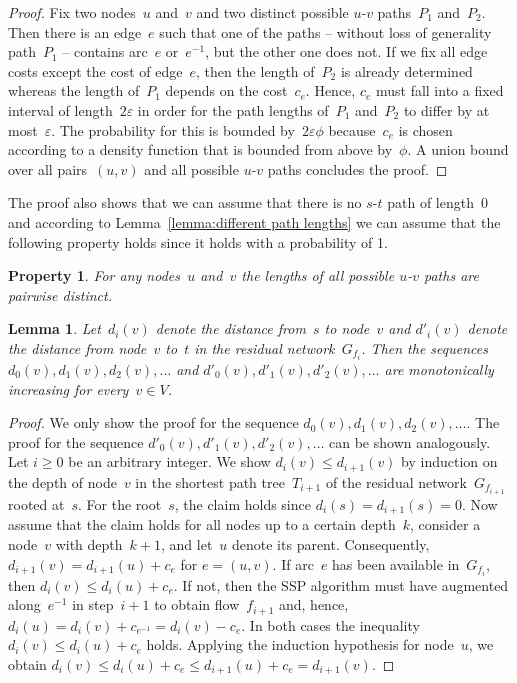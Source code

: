 \documentclass[11pt]{article}
\newtheorem{lemma}[theorem]{Lemma}
\newtheorem{property}[theorem]{Property}
\newcommand{\e}{\varepsilon}
\begin{document}
\begin{proof}
Fix two nodes~$u$ and~$v$ and two distinct possible $u$-$v$ paths~$P_1$ and~$P_2$. Then there is an edge~$e$ such that one of the paths -- without loss of generality path~$P_1$ -- contains arc~$e$ or~$e^{-1}$, but the other one does not. If we fix all edge costs except the cost of edge~$e$, then the length of~$P_2$ is already determined whereas the length of~$P_1$ depends on the cost~$c_e$. Hence, $c_e$ must fall into a fixed interval of length~$2\e$ in order for the path lengths of~$P_1$ and~$P_2$ to differ by at most~$\e$. The probability for this is bounded by~$2\e \phi$ because~$c_e$ is chosen according to a density function that is bounded from above by~$\phi$. A union bound over all pairs~$(u, v)$ and all possible $u$-$v$ paths concludes the proof. \end{proof}

The proof also shows that we can assume that there is no $s$-$t$ path of length~$0$ and according to Lemma~\ref{lemma:different path lengths} we can assume that the following property holds since it holds with a probability of 1.

\begin{property}
\label{property:different path lengths}
For any nodes~$u$ and~$v$ the lengths of all possible $u$-$v$ paths are pairwise distinct.
\end{property}

\begin{lemma}\label{lemma:distance monotonicity}
Let~$d_i(v)$ denote the distance from~$s$ to node~$v$ and $d'_i(v)$ denote the distance from node~$v$ to~$t$ in the residual network~$G_{f_i}$. Then
the sequences $d_0(v), d_1(v), d_2(v), \ldots$ and $d'_0(v), d'_1(v), d'_2(v), \ldots$ are monotonically increasing
for every~$v\in V$.
\end{lemma}

\begin{proof}
We only show the proof for the sequence $d_0(v), d_1(v), d_2(v), \ldots$. The proof for the sequence $d'_0(v), d'_1(v), d'_2(v), \ldots$ can be shown analogously.
Let $i \geq 0$ be an arbitrary integer. We show $d_i(v) \leq d_{i+1}(v)$ by induction on the depth of node~$v$ in the shortest path tree~$T_{i+1}$ of the residual network~$G_{f_{i+1}}$ rooted at~$s$. For the root~$s$, the claim holds since $d_i(s) = d_{i+1}(s) = 0$. Now assume that the claim holds for all nodes up to a certain depth~$k$, consider a node~$v$ with depth~$k+1$, and let~$u$ denote its parent. Consequently, $d_{i+1}(v) = d_{i+1}(u) + c_e$ for $e = (u, v)$. If arc~$e$ has been available in~$G_{f_i}$, then $d_i(v) \leq d_i(u) + c_e$. If not, then the SSP algorithm must have augmented along~$e^{-1}$ in step~$i+1$ to obtain flow~$f_{i+1}$ and, hence, $d_i(u) = d_i(v) + c_{e^{-1}} = d_i(v) - c_e$. In both cases the inequality $d_i(v) \leq d_i(u) + c_e$ holds. Applying the induction hypothesis for node~$u$, we obtain
$
  d_i(v)
  \leq d_i(u) + c_e
  \leq d_{i+1}(u) + c_e
  = d_{i+1}(v)
$.
\end{proof}
\end{document}
